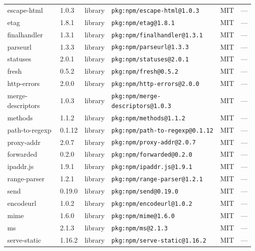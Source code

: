 \documentclass[11pt,a4paper]{article}
\begin{document}
\begin{longtable}{|p{4cm}|p{2cm}|p{1.6cm}|p{5cm}|p{1.5cm}|p{3.5cm}|}
\raggedright escape-html & 1.0.3 & library & \small\texttt{pkg:npm/escape-html@1.0.3} & MIT & \small — \\
\raggedright etag & 1.8.1 & library & \small\texttt{pkg:npm/etag@1.8.1} & MIT & \small — \\
\raggedright finalhandler & 1.3.1 & library & \small\texttt{pkg:npm/finalhandler@1.3.1} & MIT & \small — \\
\raggedright parseurl & 1.3.3 & library & \small\texttt{pkg:npm/parseurl@1.3.3} & MIT & \small — \\
\raggedright statuses & 2.0.1 & library & \small\texttt{pkg:npm/statuses@2.0.1} & MIT & \small — \\
\raggedright fresh & 0.5.2 & library & \small\texttt{pkg:npm/fresh@0.5.2} & MIT & \small — \\
\raggedright http-errors & 2.0.0 & library & \small\texttt{pkg:npm/http-errors@2.0.0} & MIT & \small — \\
\raggedright merge-descriptors & 1.0.3 & library & \small\texttt{pkg:npm/merge-descriptors@1.0.3} & MIT & \small — \\
\raggedright methods & 1.1.2 & library & \small\texttt{pkg:npm/methods@1.1.2} & MIT & \small — \\
\raggedright path-to-regexp & 0.1.12 & library & \small\texttt{pkg:npm/path-to-regexp@0.1.12} & MIT & \small — \\
\raggedright proxy-addr & 2.0.7 & library & \small\texttt{pkg:npm/proxy-addr@2.0.7} & MIT & \small — \\
\raggedright forwarded & 0.2.0 & library & \small\texttt{pkg:npm/forwarded@0.2.0} & MIT & \small — \\
\raggedright ipaddr.js & 1.9.1 & library & \small\texttt{pkg:npm/ipaddr.js@1.9.1} & MIT & \small — \\
\raggedright range-parser & 1.2.1 & library & \small\texttt{pkg:npm/range-parser@1.2.1} & MIT & \small — \\
\raggedright send & 0.19.0 & library & \small\texttt{pkg:npm/send@0.19.0} & MIT & \small — \\
\raggedright encodeurl & 1.0.2 & library & \small\texttt{pkg:npm/encodeurl@1.0.2} & MIT & \small — \\
\raggedright mime & 1.6.0 & library & \small\texttt{pkg:npm/mime@1.6.0} & MIT & \small — \\
\raggedright ms & 2.1.3 & library & \small\texttt{pkg:npm/ms@2.1.3} & MIT & \small — \\
\raggedright serve-static & 1.16.2 & library & \small\texttt{pkg:npm/serve-static@1.16.2} & MIT & \small — \\

\end{longtable}
\end{document}
